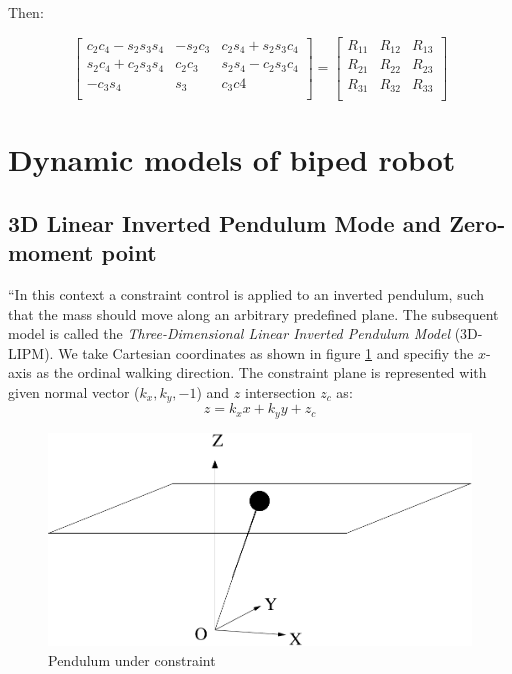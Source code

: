 Then:

\begin{equation*}
\left[
\begin{matrix}
c_2 c_4-s_2 s_3 s_4   & -s_2 c_3 & c_2 s_4 + s_2 s_3 c_4 \\
s_2 c_4 + c_2 s_3 s_4 &  c_2 c_3 & s_2 s_4 - c_2 s_3 c_4 \\
-c_3 s_4 & s_3 & c_3 c4\\
\end{matrix}
\right]
=
\left[
\begin{matrix}
R_{11} & R_{12} & R_{13} \\
R_{21} & R_{22} & R_{23} \\
R_{31} & R_{32} & R_{33} \\
\end{matrix}
\right]
\end{equation*}

\section{Dynamic models of biped robot}

\subsection{3D Linear Inverted Pendulum Mode and Zero-moment point}

``In this context a constraint control is applied to an inverted pendulum,
such that the mass should move along an arbitrary predefined plane.
The subsequent model is called the \textit{Three-Dimensional Linear Inverted Pendulum Model} (3D-LIPM). 
We take Cartesian coordinates as shown
in figure \ref{pic:PendulumUnderConstraint} and specifiy the $x$-axis as the ordinal walking 
direction. The constraint plane is represented with given normal
vector ($k_x,k_y,-1$) and $z$ intersection $z_c$ as:
\begin{equation}
z = k_x x + k_y y + z_c
\label{eq:ConstraintPlane}
\end{equation}
\begin{figure}[htb]
\begin{center}
\includegraphics[width=0.5\linewidth]{./figures/PatternGenerator/PendulumUnderConstraint}
\caption{Pendulum under constraint}
\label{pic:PendulumUnderConstraint}
\end{center}
\end{figure}

